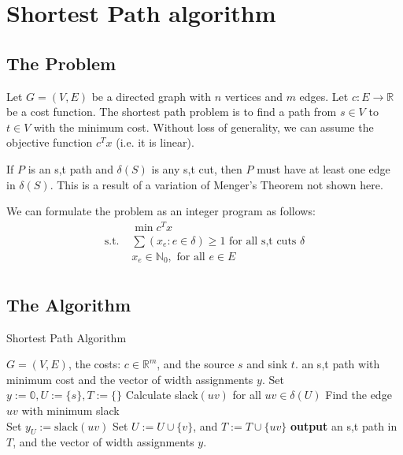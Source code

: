 \documentclass[a4paper]{report}
\begin{document}
\section{Shortest Path algorithm}
\subsection{The Problem}
\begin{definition}
  Let $G = (V, E)$ be a directed graph with $n$ vertices and $m$ edges. Let $c : E \rightarrow \mathbb R$ be a cost function. The shortest path problem is to find a path from $s \in V$ to $t \in V$ with the minimum cost. Without loss of generality, we can assume the objective function $c^T x$ (i.e. it is linear).

  \begin{corollary}
    If $P$ is an s,t path and $\delta(S)$ is any s,t cut, then $P$ must have at least one edge in $\delta(S)$. This is a result of a  variation of Menger's Theorem not shown here. 
    \end{corollary}

\end{definition}
We can formulate the problem as an integer program as follows:
\begin{align*}
  & \min c^T x \\
  \text{s.t. } & \sum (x_e : e \in \delta) \geq 1 \text{ for all s,t cuts } \delta \\
               & x_e \in \mathbb N_{0}, \text{ for all } e \in E \\
\end{align*}

\subsection{The Algorithm}
\begin{algorithm}
  \algrenewcommand{}
  \algrenewcommand{}
    \caption{Shortest Path Algorithm}
  \label{alg:path}
  \begin{algorithmic}[1]
    \Require $G = (V, E)$, the costs: $c \in \mathbb R^m$, and the source $s$ and sink $t$.
    \Ensure an s,t path with minimum cost and the vector of width assignments $y$.
    \State Set $y := \mathbb 0, U := \{s\}, T := \{\}$
      \State Calculate slack$(uv)$ for all $uv \in \delta(U)$ 
      \State Find the edge $uv$ with minimum slack \\ 
      \State Set $y_U := \text{slack}(uv)$
      \State Set $U := U \cup \{v\}$, and $T := T \cup \{uv\}$ 
    \EndWhile {}
    \State \textbf{output} an s,t path in $T$, and the vector of width assignments $y$.
  \end{algorithmic}
\end{algorithm}
\end{document}
